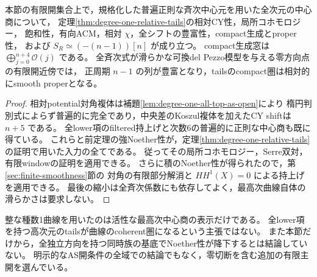\begin{corollary}\label{cor:degree-one-all-top-tails}
本節の有限開集合上で，規格化した普遍正則な斉次中心元を用いた全次元の中心商について，
定理\ref{thm:degree-one-relative-tails}の相対CY性，局所コホモロジー，
飽和性，有向ACM，相対 $\chi$，全シフトの豊富性，compact生成とproper性，
および $S_R\simeq(-(n-1))[n]$ が成り立つ。
compact生成窓は $\bigoplus_{j=0}^{n+4}\mathcal O(j)$ である。
全斉次式が滑らかな可換del Pezzo模型を与える零方向点の有限開近傍では，
正周期 $n-1$ の列が豊富となり，tailsのcompact圏は相対的にsmooth properとなる。
\end{corollary}
\begin{proof}
相対potential対角複体は補題\ref{lem:degree-one-all-top-as-open}により
楕円判別式によらず普遍的に完全であり，中央差のKoszul複体を加えたCY shiftは $n+5$ である。
全lower項のfiltered持上げと次数6の普遍的に正則な中心商も既に得ている。
これらと前定理の強Noether性が，定理\ref{thm:degree-one-relative-tails}の証明で用いた入力の全てである。
従ってその局所コホモロジー，Serre双対，有限windowの証明を適用できる。
さらに積のNoether性が得られたので，第\ref{sec:finite-smoothness}節の
対角の有限部分解消と $HH^1(X)=0$ による持上げを適用できる。
最後の縮小は全斉次係数にも依存してよく，最高次曲線自体の滑らかさは要求しない。
\end{proof}

\begin{remark}
整な種数1曲線を用いたのは活性な最高次中心商の表示だけである。
全lower項を持つ高次元のtailsが曲線のcoherent圏になるという主張ではない。
また本節だけから，全独立方向を持つ同時族の基底でNoether性が降下するとは結論していない。
明示的なAS開条件の全域での結論でもなく，零切断を含む追加の有限主開を選んでいる。
\end{remark}

